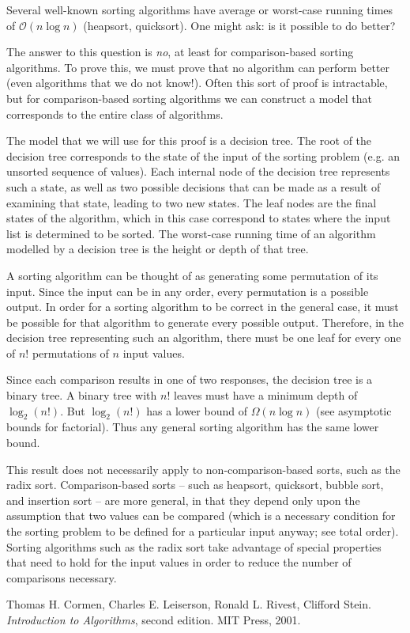 \documentclass[12pt]{article}
\begin{document}
Several well-known sorting algorithms have average or worst-case running times of $\mathcal{O}(n\log n)$ (heapsort, quicksort).  One might ask: is it possible to do better?

The answer to this question is \textit{no}, at least for comparison-based sorting algorithms.  To prove this, we must prove that no algorithm can perform better (even algorithms that we do not know!).  Often this sort of proof is intractable, but for comparison-based sorting algorithms we can construct a model that corresponds to the entire class of algorithms.

The model that we will use for this proof is a decision tree.  The root of the decision tree corresponds to the state of the input of the sorting problem (e.g. an unsorted sequence of values).  Each internal node of the decision tree represents such a state, as well as two possible decisions that can be made as a result of examining that state, leading to two new states.  The leaf nodes are the final states of the algorithm, which in this case correspond to states where the input list is determined to be sorted.  The worst-case running time of an algorithm modelled by a decision tree is the height or depth of that tree.

A sorting algorithm can be thought of as generating some permutation of its input.  Since the input can be in any order, every permutation is a possible output.  In order for a sorting algorithm to be correct in the general case, it must be possible for that algorithm to generate every possible output.  Therefore, in the decision tree representing such an algorithm, there must be one leaf for every one of $n!$ permutations of $n$ input values.

Since each comparison results in one of two responses, the decision tree is a binary tree.  A binary tree with $n!$ leaves must have a minimum depth of
$\log_2(n!)$.  But $\log_2(n!)$ has a lower bound of
$\Omega(n \log n)$ (see asymptotic bounds for factorial).
Thus any general sorting algorithm has the same lower bound.

This result does not necessarily apply to non-comparison-based sorts, such as the radix sort.  Comparison-based sorts -- such as heapsort, quicksort, bubble sort, and insertion sort -- are more general, in that they depend only upon the assumption that two values can be compared (which is a necessary condition for the sorting problem to be defined for a particular input anyway; see total order).  Sorting algorithms such as the radix sort take advantage of special properties that need to hold for the input values in order to reduce the number of comparisons necessary.

\begin{thebibliography}{3}
Thomas H. Cormen, Charles E. Leiserson, Ronald L. Rivest, Clifford Stein.
{\it Introduction to Algorithms}, second edition. MIT Press, 2001.
\end{thebibliography}

\end{document}
